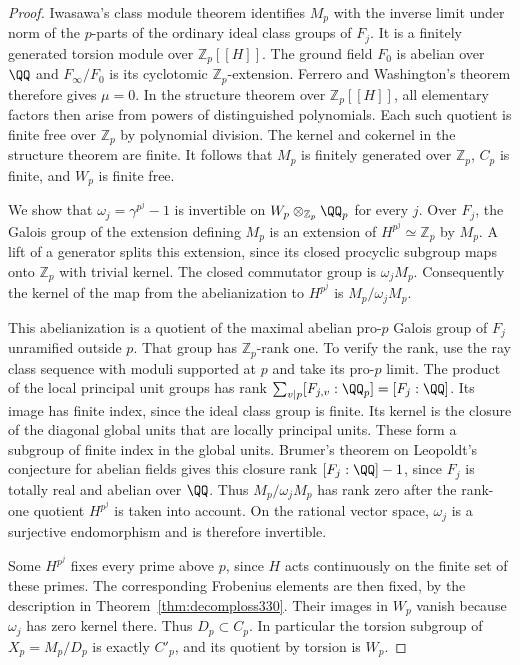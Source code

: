 \documentclass[a4paper,11pt]{article}
\theoremstyle{definition}
\theoremstyle{remark}
\newcommand{\ZZ}{\mathbb Z}\newcommand{\ord}{\operatorname{ord}}
\numberwithin{equation}{section}
\begin{document}
\begin{proof}
Iwasawa's class module theorem identifies \(M_p\) with the inverse
limit under norm of the \(p\)-parts of the ordinary ideal class
groups of \(F_j\). It is a finitely generated torsion module over
\(\ZZ_p[[H]]\). The ground field \(F_0\) is abelian over \(\QQ\)
and \(F_\infty/F_0\) is its cyclotomic \(\ZZ_p\)-extension.
Ferrero and Washington's theorem therefore gives \(\mu=0\).
In the structure theorem over \(\ZZ_p[[H]]\), all elementary
factors then arise from powers of distinguished polynomials.
Each such quotient is finite free over \(\ZZ_p\) by polynomial
division. The kernel and cokernel in the structure theorem are
finite. It follows that \(M_p\) is finitely generated over
\(\ZZ_p\), \(C_p\) is finite, and \(W_p\) is finite free.
\cite{V-III-II-iwasawa15,V-III-II-fw13}

We show that \(\omega_j=\gamma^{p^j}-1\) is invertible on
\(W_p\otimes_{\ZZ_p}\QQ_p\) for every \(j\). Over \(F_j\), the
Galois group of the extension defining \(M_p\) is an extension
of \(H^{p^j}\simeq\ZZ_p\) by \(M_p\). A lift of a generator
splits this extension, since its closed procyclic subgroup maps
onto \(\ZZ_p\) with trivial kernel. The closed commutator group
is \(\omega_j M_p\). Consequently the kernel of the map from the
abelianization to \(H^{p^j}\) is \(M_p/\omega_j M_p\).

This abelianization is a quotient of the maximal abelian pro-\(p\)
Galois group of \(F_j\) unramified outside \(p\). That group
has \(\ZZ_p\)-rank one. To verify the rank, use the ray class
sequence with moduli supported at \(p\) and take its pro-\(p\)
limit. The product of the local principal unit groups has rank
\(\sum_{v\mid p}[F_{j,v}:\QQ_p]=[F_j:\QQ]\). Its image has finite
index, since the ideal class group is finite. Its kernel is
the closure of the diagonal global units that are locally
principal units. These form a subgroup of finite index in the
global units. Brumer's theorem on Leopoldt's conjecture for
abelian fields gives this closure rank \([F_j:\QQ]-1\), since
\(F_j\) is totally real and abelian over \(\QQ\).
\cite{V-III-brumer330} Thus \(M_p/\omega_j M_p\) has rank zero
after the rank-one quotient \(H^{p^j}\) is taken into account.
On the rational vector space, \(\omega_j\) is a surjective
endomorphism and is therefore invertible.

Some \(H^{p^j}\) fixes every prime above \(p\), since \(H\)
acts continuously on the finite set of these primes. The
corresponding Frobenius elements are then fixed, by the
description in Theorem~\ref{thm:decomploss330}. Their images
in \(W_p\) vanish because \(\omega_j\) has zero kernel there.
Thus \(D_p\subset C_p\). In particular the torsion subgroup of
\(X_p=M_p/D_p\) is exactly \(C'_p\), and its quotient by torsion
is \(W_p\).


\end{proof}
\end{document}
